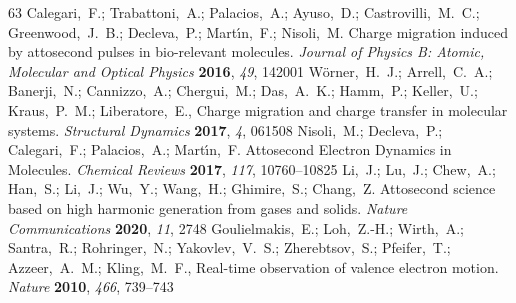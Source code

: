 \documentclass[journal=jacsat,manuscript=article]{achemso}
\begin{document}
\begin{mcitethebibliography}{63}
Calegari,~F.; Trabattoni,~A.; Palacios,~A.; Ayuso,~D.; Castrovilli,~M.~C.;
  Greenwood,~J.~B.; Decleva,~P.; Mart{\'{\i}}n,~F.; Nisoli,~M. Charge migration
  induced by attosecond pulses in bio-relevant molecules. \emph{Journal of
  Physics B: Atomic, Molecular and Optical Physics} \textbf{2016}, \emph{49},
  142001\relax
\mciteBstWouldAddEndPuncttrue
\mciteSetBstMidEndSepPunct{\mcitedefaultmidpunct}
{\mcitedefaultendpunct}{\mcitedefaultseppunct}\relax
\EndOfBibitem
{}
Wörner,~H.~J.; Arrell,~C.~A.; Banerji,~N.; Cannizzo,~A.; Chergui,~M.;
  Das,~A.~K.; Hamm,~P.; Keller,~U.; Kraus,~P.~M.; Liberatore,~E.,
    Charge migration and charge transfer in molecular systems.
  \emph{Structural Dynamics} \textbf{2017}, \emph{4}, 061508\relax
\mciteBstWouldAddEndPuncttrue
\mciteSetBstMidEndSepPunct{\mcitedefaultmidpunct}
{\mcitedefaultendpunct}{\mcitedefaultseppunct}\relax
\EndOfBibitem
{}
Nisoli,~M.; Decleva,~P.; Calegari,~F.; Palacios,~A.; Mart\'{\i}n,~F. Attosecond
  Electron Dynamics in Molecules. \emph{Chemical Reviews} \textbf{2017},
  \emph{117}, 10760--10825\relax
\mciteBstWouldAddEndPuncttrue
\mciteSetBstMidEndSepPunct{\mcitedefaultmidpunct}
{\mcitedefaultendpunct}{\mcitedefaultseppunct}\relax
\EndOfBibitem
{}
Li,~J.; Lu,~J.; Chew,~A.; Han,~S.; Li,~J.; Wu,~Y.; Wang,~H.; Ghimire,~S.;
  Chang,~Z. Attosecond science based on high harmonic generation from gases and
  solids. \emph{Nature Communications} \textbf{2020}, \emph{11}, 2748\relax
\mciteBstWouldAddEndPuncttrue
\mciteSetBstMidEndSepPunct{\mcitedefaultmidpunct}
{\mcitedefaultendpunct}{\mcitedefaultseppunct}\relax
\EndOfBibitem
{}
Goulielmakis,~E.; Loh,~Z.-H.; Wirth,~A.; Santra,~R.; Rohringer,~N.;
  Yakovlev,~V.~S.; Zherebtsov,~S.; Pfeifer,~T.; Azzeer,~A.~M.; Kling,~M.~F.,
    Real-time observation of valence electron motion.
  \emph{Nature} \textbf{2010}, \emph{466}, 739--743\relax
\mciteBstWouldAddEndPuncttrue
\mciteSetBstMidEndSepPunct{\mcitedefaultmidpunct}

\end{mcitethebibliography}
\end{document}
